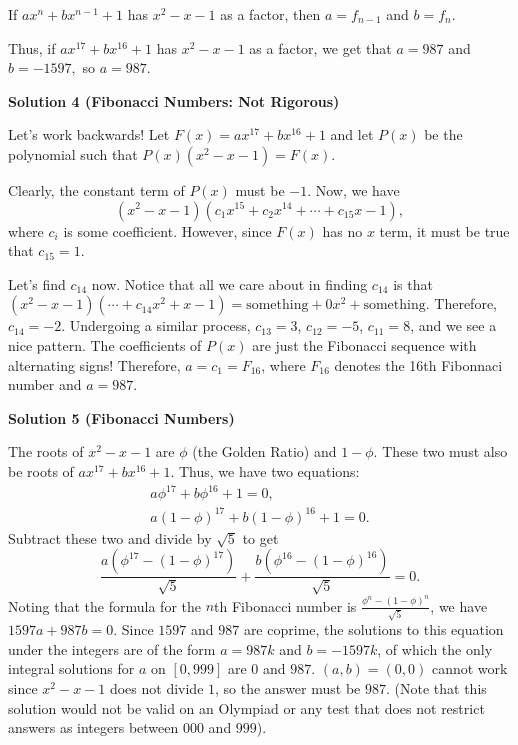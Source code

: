 \begin{enumerate}
 If $ax^n+bx^{n-1}+1$ has $x^2-x-1$ as a factor, then $a=f_{n-1}$ and $b = f_n.$

 Thus, if $ax^{17}+bx^{16}+1$ has $x^2-x-1$ as a factor, we get that $a = 987$ and $b = -1597,$ so $a = \boxed {987}$.

 



\textbf{Solution 4 (Fibonacci Numbers: Not Rigorous)}

Let's work backwards! Let $F(x) = ax^{17} + bx^{16} + 1$ and let $P(x)$ be the polynomial such that $P(x)(x^2 - x - 1) = F(x)$.

 Clearly, the constant term of $P(x)$ must be $- 1$. Now, we have 
 \[(x^2 - x - 1)(c_1x^{15} + c_2x^{14} + \cdots + c_{15}x - 1),\] where $c_{i}$ is some coefficient. However, since $F(x)$ has no $x$ term, it must be true that $c_{15} = 1$. 

 Let's find $c_{14}$ now. Notice that all we care about in finding $c_{14}$ is that $(x^2 - x - 1)(\cdots + c_{14}x^2 + x - 1) = \text{something} + 0x^2 + \text{something}$. Therefore, $c_{14} = - 2$. Undergoing a similar process, $c_{13} = 3$, $c_{12} = - 5$, $c_{11} = 8$, and we see a nice pattern. The coefficients of $P(x)$ are just the Fibonacci sequence with alternating signs! Therefore, $a = c_1 = F_{16}$, where $F_{16}$ denotes the 16th Fibonnaci number and $a = \boxed{987}$.

 



\textbf{Solution 5 (Fibonacci Numbers)}

The roots of $x^2-x-1$ are $\phi$ (the Golden Ratio) and $1-\phi$. These two must also be roots of $ax^{17}+bx^{16}+1$. Thus, we have two equations: 
 \begin{align*} a\phi^{17}+b\phi^{16}+1=0, \\ a(1-\phi)^{17}+b(1-\phi)^{16}+1=0. \end{align*}
Subtract these two and divide by $\sqrt{5}$ to get 
 \[\frac{a(\phi^{17}-(1-\phi)^{17})}{\sqrt{5}}+\frac{b(\phi^{16}-(1-\phi)^{16})}{\sqrt{5}}=0.\] Noting that the formula for the $n$th Fibonacci number is $\frac{\phi^n-(1-\phi)^n}{\sqrt{5}}$, we have $1597a+987b=0$. Since $1597$ and $987$ are coprime, the solutions to this equation under the integers are of the form $a=987k$ and $b=-1597k$, of which the only integral solutions for $a$ on $[0,999]$ are $0$ and $987$. $(a,b)=(0,0)$ cannot work since $x^2-x-1$ does not divide $1$, so the answer must be $\boxed{987}$. (Note that this solution would not be valid on an Olympiad or any test that does not restrict answers as integers between $000$ and $999$).


\end{enumerate}
